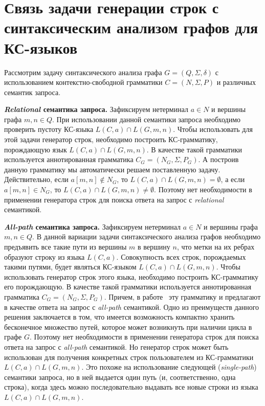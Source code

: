 \section{Связь задачи генерации строк с синтаксическим анализом графов для КС-языков}

Рассмотрим задачу синтаксического анализа графа $G = (Q, \Sigma, \delta)$ с использованием контекстно-свободной грамматики $C = (N, \Sigma, P)$ и различных семантик запроса.

\textbf{\textit{Relational} семантика запроса.} Зафиксируем нетерминал $a \in N$ и вершины графа $m, n \in Q$. При использовании данной семантики запроса необходимо проверить пустоту КС-языка $L(C,a) \cap L(G,m,n)$. Чтобы использовать для этой задачи генератор строк, необходимо построить КС-грамматику, порождающую язык $L(C,a) \cap L(G,m,n)$. В качестве такой грамматики используется аннотированная грамматика $C_{G} = (N_{G}, \Sigma, P_{G})$. А построив данную грамматику мы автоматически решаем поставленную задачу. Действительно, если $a[m,n] \notin N_{G}$, то $L(C,a) \cap L(G,m,n) = \emptyset$, а если $a[m,n] \in N_{G}$, то $L(C,a) \cap L(G,m,n) \ne \emptyset$. Поэтому нет необходимости в применении генератора строк для поиска ответа на запрос с \textit{relational} семантикой.

\textbf{\textit{All-path} семантика запроса.} Зафиксируем нетерминал $a \in N$ и вершины графа $m, n \in Q$. В данной вариации задачи синтаксического анализа графов необходимо предъявить все такие пути из вершины $m$ в вершину $n$, что метки на их ребрах образуют строку из языка $L(C,a)$. Совокупность всех строк, порождаемых такими путями, будет являться КС-языком $L(C,a) \cap L(G,m,n)$. Чтобы использовать генератор строк этого языка, необходимо построить КС-грамматику его порождающую. В качестве такой грамматики используется аннотированная грамматика $C_{G} = (N_{G}, \Sigma, P_{G})$. Причем, в работе~\cite{azimov-spbu-hellings2} эту грамматику и предлагают в качестве ответа на запрос с \textit{all-path} семантикой. Одно из преимуществ данного решения заключается в том, что имеется возможность компактно хранить бесконечное множество путей, которое может возникнуть при наличии цикла в графе $G$. Поэтому нет необходимости в применении генератора строк для поиска ответа на запрос с \textit{all-path} семантикой. Но генератор строк может быть использован для получения конкретных строк пользователем из КС-грамматики $L(C,a) \cap L(G,m,n)$. Это похоже на использование следующей (\textit{single-path}) семантики запроса, но в ней выдается один путь (и, соответственно, одна строка), когда здесь можно последовательно выдавать все новые строки из языка $L(C,a) \cap L(G,m,n)$.

